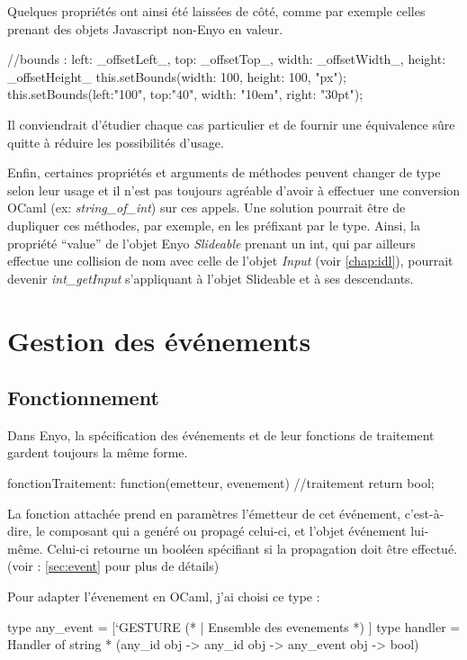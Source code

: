 \documentclass[11pt,a4paper]{report}
\begin{document}
Quelques propriétés ont ainsi été laissées de côté, comme par exemple celles prenant des
objets Javascript non-Enyo en valeur.

\begin{JavaScript}
//bounds : {left: _offsetLeft_, top: _offsetTop_, width: _offsetWidth_, height: _offsetHeight_}
this.setBounds({width: 100, height: 100}, "px");
this.setBounds({left:"100", top:"40", width: "10em", right: "30pt"});
\end{JavaScript}

Il conviendrait d'étudier chaque cas particulier et de fournir une équivalence sûre quitte à
réduire les possibilités d'usage.\medskip

Enfin, certaines propriétés et arguments de méthodes peuvent changer de type selon leur usage 
et il n'est pas toujours agréable d'avoir à effectuer une conversion OCaml (ex: \emph{string\_of\_int})
sur ces appels. Une solution pourrait être de dupliquer ces méthodes, par exemple, en les préfixant 
par le type. Ainsi, la propriété ``value''  de l'objet Enyo \emph{Slideable} prenant un int, qui par ailleurs 
effectue une collision de nom avec celle de l'objet \emph{Input} (voir \ref{chap:idl}), pourrait 
devenir \emph{int\_getInput} s'appliquant à l'objet Slideable et à ses descendants.

\section{Gestion des événements}\label{gestevent}
\subsection{Fonctionnement}
Dans Enyo, la spécification des événements et de leur fonctions de traitement gardent toujours la même
forme.

\begin{JavaScript}
  fonctionTraitement: function(emetteur, evenement){
                          //traitement
                          return bool; }
\end{JavaScript}

La fonction attachée prend en paramètres l'émetteur de cet événement, c'est-à-dire, 
le composant qui a genéré ou propagé celui-ci, et l'objet événement lui-même.
Celui-ci retourne un booléen spécifiant si la propagation doit être effectué.
(voir : \ref{sec:event} pour plus de détails)

Pour adapter l'évenement en OCaml, j'ai choisi ce type :
\begin{OCaml}
  type any_event = [`GESTURE (* |  Ensemble des evenements *) ]
  type handler = Handler of string * (any_id obj -> any_id obj -> any_event obj -> bool)
\end{OCaml}
\end{document}
